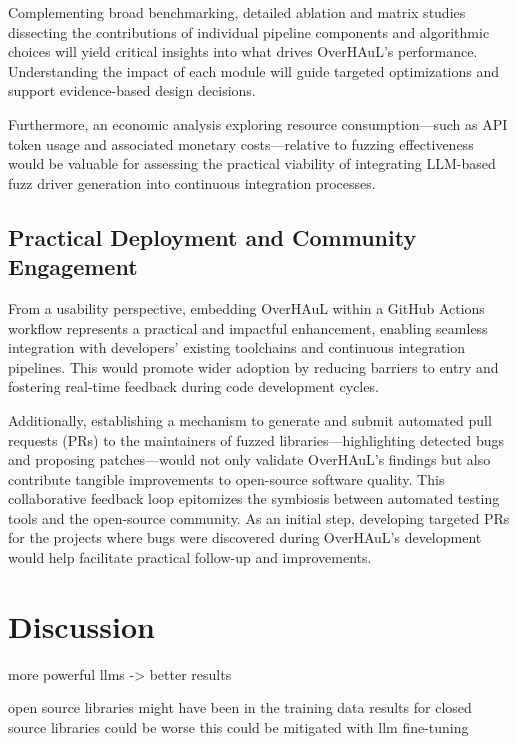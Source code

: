 \documentclass[
  a4paper,
  DIV=11,
  numbers=noendperiod]{scrreprt}
\theoremstyle{definition}
\theoremstyle{remark}
\begin{document}
Complementing broad benchmarking, detailed ablation and matrix studies
dissecting the contributions of individual pipeline components and
algorithmic choices will yield critical insights into what drives
OverHAuL's performance. Understanding the impact of each module will
guide targeted optimizations and support evidence-based design
decisions.

Furthermore, an economic analysis exploring resource consumption---such
as API token usage and associated monetary costs---relative to fuzzing
effectiveness would be valuable for assessing the practical viability of
integrating LLM-based fuzz driver generation into continuous integration
processes.

\section{Practical Deployment and Community
Engagement}\label{practical-deployment-and-community-engagement}

From a usability perspective, embedding OverHAuL within a GitHub Actions
workflow represents a practical and impactful enhancement, enabling
seamless integration with developers' existing toolchains and continuous
integration pipelines. This would promote wider adoption by reducing
barriers to entry and fostering real-time feedback during code
development cycles.

Additionally, establishing a mechanism to generate and submit automated
pull requests (PRs) to the maintainers of fuzzed
libraries---highlighting detected bugs and proposing patches---would not
only validate OverHAuL's findings but also contribute tangible
improvements to open-source software quality. This collaborative
feedback loop epitomizes the symbiosis between automated testing tools
and the open-source community. As an initial step, developing targeted
PRs for the projects where bugs were discovered during OverHAuL's
development would help facilitate practical follow-up and improvements.


\chapter{Discussion}\label{discussion}

more powerful llms -\textgreater{} better results

open source libraries might have been in the training data results for
closed source libraries could be worse this could be mitigated with llm
fine-tuning
\end{document}
